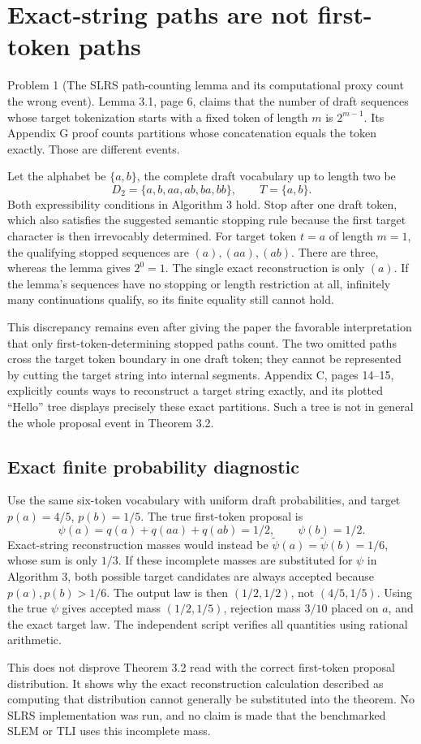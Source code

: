 \documentclass[10pt]{article}
\begin{document}
\section*{Exact-string paths are not first-token paths}
Problem 1 (The SLRS path-counting lemma and its computational proxy count the wrong event).  Lemma 3.1, page 6, claims that the number of draft sequences whose target tokenization starts with a fixed token of length \(m\) is \(2^{m-1}\). Its Appendix G proof counts partitions whose concatenation equals the token exactly. Those are different events.\par
Let the alphabet be \(\{a,b\}\), the complete draft vocabulary up to length two be \[D_2=\{a,b,aa,ab,ba,bb\},\qquad T=\{a,b\}.\] Both expressibility conditions in Algorithm 3 hold. Stop after one draft token, which also satisfies the suggested semantic stopping rule because the first target character is then irrevocably determined. For target token \(t=a\) of length \(m=1\), the qualifying stopped sequences are \((a),(aa),(ab)\). There are three, whereas the lemma gives \(2^0=1\). The single exact reconstruction is only \((a)\). If the lemma’s sequences have no stopping or length restriction at all, infinitely many continuations qualify, so its finite equality still cannot hold.\par
This discrepancy remains even after giving the paper the favorable interpretation that only first-token-determining stopped paths count. The two omitted paths cross the target token boundary in one draft token; they cannot be represented by cutting the target string into internal segments. Appendix C, pages 14–15, explicitly counts ways to reconstruct a target string exactly, and its plotted “Hello” tree displays precisely these exact partitions. Such a tree is not in general the whole proposal event in Theorem 3.2.\par
\subsection*{Exact finite probability diagnostic}
Use the same six-token vocabulary with uniform draft probabilities, and target \(p(a)=4/5\), \(p(b)=1/5\). The true first-token proposal is \[\psi(a)=q(a)+q(aa)+q(ab)=1/2,\qquad\psi(b)=1/2.\] Exact-string reconstruction masses would instead be \(\widetilde\psi(a)=\widetilde\psi(b)=1/6\), whose sum is only \(1/3\). If these incomplete masses are substituted for \(\psi\) in Algorithm 3, both possible target candidates are always accepted because \(p(a),p(b)>1/6\). The output law is then \((1/2,1/2)\), not \((4/5,1/5)\). Using the true \(\psi\) gives accepted mass \((1/2,1/5)\), rejection mass \(3/10\) placed on \(a\), and the exact target law. The independent script verifies all quantities using rational arithmetic.\par
This does not disprove Theorem 3.2 read with the correct first-token proposal distribution. It shows why the exact reconstruction calculation described as computing that distribution cannot generally be substituted into the theorem. No SLRS implementation was run, and no claim is made that the benchmarked SLEM or TLI uses this incomplete mass.\par
\end{document}
